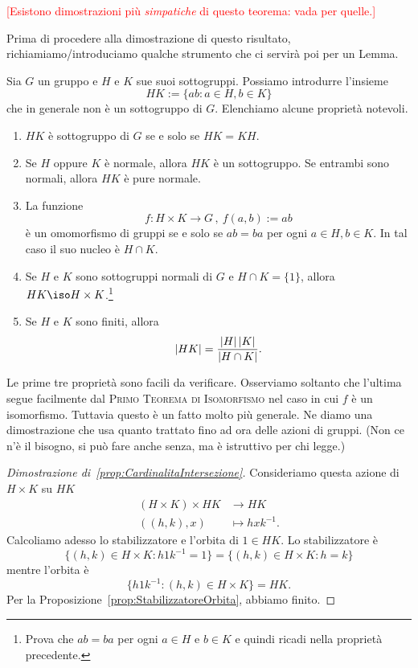\textcolor{red}{[Esistono dimostrazioni più {\em simpatiche} di questo teorema: vada per quelle.]}

Prima di procedere alla dimostrazione di questo risultato, richiamiamo/introduciamo qualche strumento che ci servirà poi per un Lemma.

\begin{osse}
Sia $G$ un gruppo e $H$ e $K$ sue suoi sottogruppi. Possiamo introdurre l'insieme
\[HK := \{ab :  a \in H, b \in K\}\]
che in generale non è un sottogruppo di $G$. Elenchiamo alcune proprietà notevoli.
\begin{enumerate}
\item $HK$ è sottogruppo di $G$ se e solo se $HK=KH$.
\item Se $H$ oppure $K$ è normale, allora $HK$ è un sottogruppo. Se entrambi sono normali, allora $HK$ è pure normale.
\item La funzione
\[f : H \times K \to G \,,\ f(a,b) := ab\]
è un omomorfismo di gruppi se e solo se $ab=ba$ per ogni $a \in H, b \in K$. In tal caso il suo nucleo è $H\cap K$.
\item Se $H $ e $K$ sono sottogruppi normali di $G$ e $H \cap K=\{1\}$, allora $HK \iso H \times K$.\footnote{Prova che $ab = ba$ per ogni $a \in H$ e $b \in K$ e quindi ricadi nella proprietà precedente.}
\item \label{prop:CardinalitaIntersezione} Se $H$ e $K$ sono finiti, allora
\[ \left\lvert HK\right\rvert=\frac{\left\lvert H\right\rvert\left\lvert K\right\rvert}{\left\lvert H\cap K\right\rvert}. \]
\end{enumerate}
Le prime tre proprietà sono facili da verificare. Osserviamo soltanto che l'ultima segue facilmente dal {\scshape Primo Teorema di Isomorfismo} nel caso in cui $f$ è un isomorfismo. Tuttavia questo è un fatto molto più generale. Ne diamo una dimostrazione che usa quanto trattato fino ad ora delle azioni di gruppi. (Non ce n'è il bisogno, si può fare anche senza, ma è istruttivo per chi legge.)
%
\begin{proof}[Dimostrazione di~\ref{prop:CardinalitaIntersezione}]
Consideriamo questa azione di $H \times K$ su $HK$
\[\begin{aligned}
(H \times K) \times HK &\to HK \\ 
((h, k), x) &\mapsto hxk^{-1} .
\end{aligned}\]
Calcoliamo adesso lo stabilizzatore e l'orbita di $1 \in HK$. Lo stabilizzatore è
\[\{(h, k) \in H \times K :  h 1 k^{-1} = 1\} = \{(h, k) \in H \times K :  h = k\}\]
mentre l'orbita è
\[\{h 1 k^{-1} : (h, k) \in H \times K\} = HK .\]
Per la Proposizione~\ref{prop:StabilizzatoreOrbita}, abbiamo finito.
\end{proof}
\end{osse}

